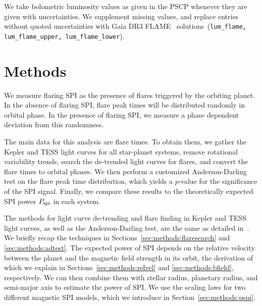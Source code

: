 \documentclass[twocolumn]{aastex631}
\begin{document}
We take bolometric luminosity values as given in the PSCP whenever they are given with uncertainties. We supplement missing values, and replace entries without quoted uncertainties with Gaia DR3 FLAME~\citep{fouesneau2022gaia} solutions~(\texttt{lum\_flame, lum\_flame\_upper, lum\_flame\_lower}). 

\section{Methods}
\label{sec:methods}
We measure flaring SPI as the presence of flares triggered by the orbiting planet. In the absence of flaring SPI, flare peak times will be distributed randomly in orbital phase. In the presence of flaring SPI, we measure a phase dependent deviation from this randomness.

The main data for this analysis are flare times. To obtain them, we gather the Kepler and TESS light curves for all star-planet systems, remove rotational variability trends, search the de-trended light curves for flares, and convert the flare times to orbital phases. We then perform a customized Anderson-Darling test on the flare peak time distribution, which yields a $p$-value for the significance of the SPI signal. Finally, we compare these results to the theoretically expected SPI power $P_{\rm spi}$ in each system.

The methods for light curve de-trending and flare finding in Kepler and TESS light curves, as well as the Anderson-Darling test, are the same as detailed in~\citet{ilin2022searching}. We briefly recap the techniques in Sections~\ref{sec:methods:flaresearch} and \ref{sec:methods:adtest}. The expected power of SPI depends on the relative velocity between the planet and the magnetic field strength in its orbit, the derivation of which we explain in 
Sections~\ref{sec:methods:relvel} and \ref{sec:methods:bfield}, respectively. We can then combine them with stellar radius, planetary radius, and semi-major axis to estimate the power of SPI. We use the scaling laws for two different magnetic SPI models, which we introduce in Section~\ref{sec:methods:pspi}.
\end{document}
